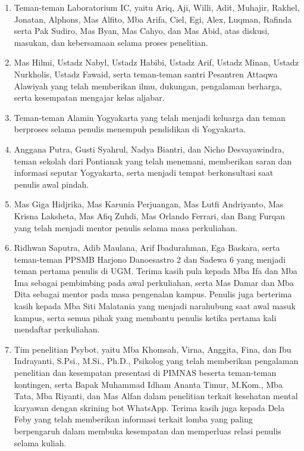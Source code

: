 \begin{enumerate}
	\item Teman-teman Laboratorium IC, yaitu Ariq, Aji, Willi, Adit, Muhajir,
	Rakhel, Jonatan, Alphons, Mas Alfito, Mba Arifa, Ciel, Egi, Alex, Luqman, Rafinda serta Pak Sudiro, Mas Byan, Mas Cahyo, dan
	Mas Abid, atas diskusi, masukan, dan kebersamaan selama proses penelitian.
	
	\item Mas Hilmi, Ustadz Nabyl, Ustadz Habibi, Ustadz Arif, Ustadz Minan,
	Ustadz Nurkholis, Ustadz Fawaid, serta teman-teman santri Pesantren Attaqwa
	Alawiyah yang telah memberikan ilmu, dukungan, pengalaman berharga, serta
	kesempatan mengajar kelas aljabar.
	
	\item Teman-teman Alamin Yogyakarta yang telah menjadi keluarga dan teman
	berproses selama penulis menempuh pendidikan di Yogyakarta.

	\item Anggana Putra, Gusti Syahrul, Nadya Biantri, dan Nicho
	Desvayawindra, teman sekolah dari Pontianak yang telah menemani,
	memberikan saran dan informasi seputar Yogyakarta, serta menjadi tempat
	berkonsultasi saat penulis awal pindah.

	\item Mas Giga Hidjrika, Mas Karunia Perjuangan, Mas Lutfi Andriyanto, Mas
	Krisna Laksheta, Mas Afiq Zuhdi, Mas Orlando Ferrari, dan Bang Furqan yang
	telah menjadi mentor penulis selama masa perkuliahan.
	
	\item Ridhwan Saputra, Adib Maulana, Arif Ibadurahman, Ega Baskara, serta
	teman-teman PPSMB Harjono Danoesastro 2 dan Sadewa 6 yang menjadi teman
	pertama penulis di UGM. Terima kasih pula kepada Mba Ifa dan Mba Ima
	sebagai pembimbing pada awal perkuliahan, serta Mas Damar dan Mba Dita
	sebagai mentor pada masa pengenalan kampus. Penulis juga berterima kasih
	kepada Mba Siti Malatania yang menjadi narahubung saat awal masuk kampus,
	serta semua pihak yang membantu penulis ketika pertama kali mendaftar
	perkuliahan.

	\item Tim penelitian Psybot, yaitu Mba Khomsah, Virna, Anggita, Fina, dan
	Ibu Indrayanti, S.Psi., M.Si., Ph.D., Psikolog yang telah memberikan
	pengalaman penelitian dan kesempatan presentasi di PIMNAS beserta
	teman-teman kontingen, serta Bapak Muhammad Idham Ananta Timur, M.Kom.,
	Mba Tata, Mba Riyanti, dan Mas Alfan dalam penelitian terkait kesehatan
	mental karyawan dengan skrining bot WhatsApp. Terima kasih juga kepada Dela
	Feby yang telah memberikan informasi terkait lomba yang paling berpengaruh dalam membuka kesempatan dan memperluas relasi penulis selama kuliah.
	

\end{enumerate}
